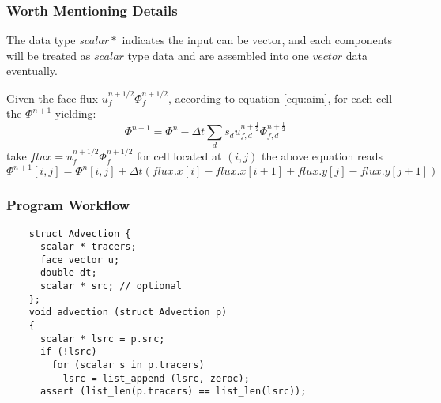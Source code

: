 \documentclass[a4paper]{article}
\newcommand{\para}[1]{\textbf{\emph{\textcolor{para}{#1}}}}
\begin{document}
\subsubsection{Worth Mentioning Details}\label{sec:direction}
The data type $scalar*$ indicates the input can be vector, and each components will be treated as $scalar$ type data and are assembled into one $vector$ data eventually.\par
Given the face flux $u^{n+1/2}_f \Phi^{n+1/2}_f$, according to equation \ref{equ:aim}, for each cell the $\Phi^{n+1}$ yielding:
\begin{equation}
    \Phi^{n+1} = \Phi^n-\Delta t \sum_{d} s_d u_{f,d}^{n+ \frac{1}{2}}\Phi_{f,d}^{n + \frac{1}{2}}
\end{equation}
take $flux = u^{n+1/2}_f \Phi^{n+1/2}_f$ for cell located at $(i,j)$ the above equation reads
\begin{equation}
    \Phi^{n+1}[i,j] = \Phi^n[i,j] + \Delta t (flux.x[i] - flux.x[i+1] + flux.y[j] - flux.y[j+1])
\end{equation}

\subsubsection{Program Workflow}
\begin{multicols}{2}
  \columnbreak
  \begin{verbatim}
    struct Advection {
      scalar * tracers;
      face vector u;
      double dt;
      scalar * src; // optional
    };
    void advection (struct Advection p)
    {
      scalar * lsrc = p.src;
      if (!lsrc)
        for (scalar s in p.tracers)
          lsrc = list_append (lsrc, zeroc);
      assert (list_len(p.tracers) == list_len(lsrc));
  \end{verbatim}
\end{multicols}

\begin{center}
\end{center}
\end{document}
